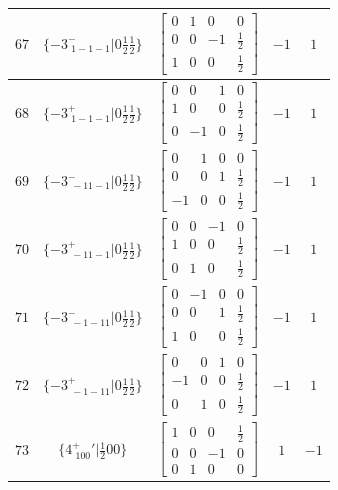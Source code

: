 \documentclass[fleqn,8pt]{jsarticle}
\begin{document}
\begin{longtable}{ccccc}
$ 67 $ & $ \{-3^{-}_{\,\,1-1-1}|0 \frac{1}{2} \frac{1}{2}\} $ & $ \begin{bmatrix} 0 & 1 & 0 & 0 \\ 0 & 0 & -1 & \frac{1}{2} \\ 1 & 0 & 0 & \frac{1}{2} \end{bmatrix} $ & $ -1 $ & $ 1 $ \\ \hline
$ 68 $ & $ \{-3^{+}_{\,\,1-1-1}|0 \frac{1}{2} \frac{1}{2}\} $ & $ \begin{bmatrix} 0 & 0 & 1 & 0 \\ 1 & 0 & 0 & \frac{1}{2} \\ 0 & -1 & 0 & \frac{1}{2} \end{bmatrix} $ & $ -1 $ & $ 1 $ \\ \hline
$ 69 $ & $ \{-3^{-}_{\,\,-11-1}|0 \frac{1}{2} \frac{1}{2}\} $ & $ \begin{bmatrix} 0 & 1 & 0 & 0 \\ 0 & 0 & 1 & \frac{1}{2} \\ -1 & 0 & 0 & \frac{1}{2} \end{bmatrix} $ & $ -1 $ & $ 1 $ \\ \hline
$ 70 $ & $ \{-3^{+}_{\,\,-11-1}|0 \frac{1}{2} \frac{1}{2}\} $ & $ \begin{bmatrix} 0 & 0 & -1 & 0 \\ 1 & 0 & 0 & \frac{1}{2} \\ 0 & 1 & 0 & \frac{1}{2} \end{bmatrix} $ & $ -1 $ & $ 1 $ \\ \hline
$ 71 $ & $ \{-3^{-}_{\,\,-1-11}|0 \frac{1}{2} \frac{1}{2}\} $ & $ \begin{bmatrix} 0 & -1 & 0 & 0 \\ 0 & 0 & 1 & \frac{1}{2} \\ 1 & 0 & 0 & \frac{1}{2} \end{bmatrix} $ & $ -1 $ & $ 1 $ \\ \hline
$ 72 $ & $ \{-3^{+}_{\,\,-1-11}|0 \frac{1}{2} \frac{1}{2}\} $ & $ \begin{bmatrix} 0 & 0 & 1 & 0 \\ -1 & 0 & 0 & \frac{1}{2} \\ 0 & 1 & 0 & \frac{1}{2} \end{bmatrix} $ & $ -1 $ & $ 1 $ \\ \hline
$ 73 $ & $ \{4^{+}_{\,\,100}{}'|\frac{1}{2} 0 0\} $ & $ \begin{bmatrix} 1 & 0 & 0 & \frac{1}{2} \\ 0 & 0 & -1 & 0 \\ 0 & 1 & 0 & 0 \end{bmatrix} $ & $ 1 $ & $ -1 $ \\ \hline

\end{longtable}
\end{document}
